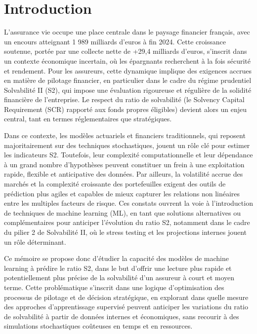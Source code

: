 \chapter*{Introduction}


L’assurance vie occupe une place centrale dans le paysage financier français, avec un encours atteignant 1 989 milliards d’euros à fin 2024. Cette croissance soutenue, portée par une collecte nette de +29,4 milliards d’euros, s’inscrit dans un contexte économique incertain, où les épargnants recherchent à la fois sécurité et rendement. Pour les assureurs, cette dynamique implique des exigences accrues en matière de pilotage financier, en particulier dans le cadre du régime prudentiel Solvabilité II (S2), qui impose une évaluation rigoureuse et régulière de la solidité financière de l’entreprise. Le respect du ratio de solvabilité (le Solvency Capital Requirement (SCR) rapporté aux fonds propres éligibles) devient alors un enjeu central, tant en termes réglementaires que stratégiques.

Dans ce contexte, les modèles actuariels et financiers traditionnels, qui reposent majoritairement sur des techniques stochastiques, jouent un rôle clé pour estimer les indicateurs S2. Toutefois, leur complexité computationnelle et leur dépendance à un grand nombre d’hypothèses peuvent constituer un frein à une exploitation rapide, flexible et anticipative des données. Par ailleurs, la volatilité accrue des marchés et la complexité croissante des portefeuilles exigent des outils de prédiction plus agiles et capables de mieux capturer les relations non linéaires entre les multiples facteurs de risque. Ces constats ouvrent la voie à l’introduction de techniques de machine learning (ML), en tant que solutions alternatives ou complémentaires pour anticiper l’évolution du ratio S2, notamment dans le cadre du pilier 2 de Solvabilité II, où le stress testing et les projections internes jouent un rôle déterminant.

Ce mémoire se propose donc d’étudier la capacité des modèles de machine learning à prédire le ratio S2, dans le but d’offrir une lecture plus rapide et potentiellement plus précise de la solvabilité d’un assureur à court et moyen terme. Cette problématique s’inscrit dans une logique d’optimisation des processus de pilotage et de décision stratégique, en explorant dans quelle mesure des approches d’apprentissage supervisé peuvent anticiper les variations du ratio de solvabilité à partir de données internes et économiques, sans recourir à des simulations stochastiques coûteuses en temps et en ressources.

